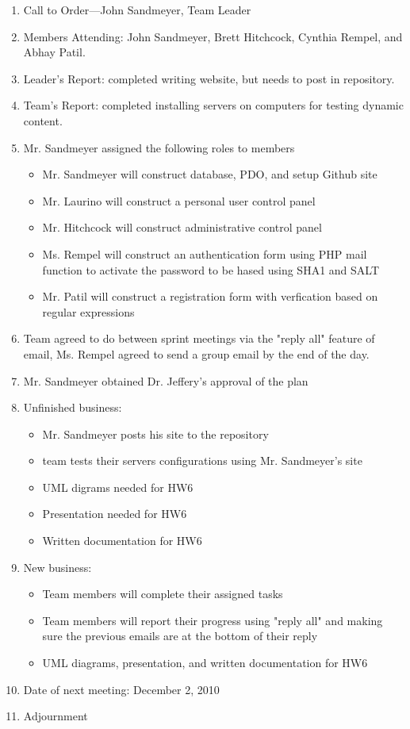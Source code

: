 \documentclass[10pt, oneside, letterpaper]{book}
\begin{document}
\begin{enumerate}
\itemindent=-75pt
\rightmargin=0pt
\item{Call to Order---John Sandmeyer, Team Leader}
\item{Members Attending: John Sandmeyer, Brett Hitchcock, Cynthia Rempel, and Abhay Patil.}
\item{Leader's Report: completed writing website, but needs to post in repository.}
\item{Team's Report: completed installing servers on computers for testing dynamic content.}
\item{Mr. Sandmeyer assigned the following roles to members}
\begin{itemize}
\itemindent=-75pt
\item Mr. Sandmeyer will construct database, PDO, and setup Github site
\item Mr. Laurino will construct a personal user control panel
\item Mr. Hitchcock will construct administrative control panel
\item Ms. Rempel will construct an authentication form using PHP mail function to activate the password to be hased using SHA1 and SALT
\item Mr. Patil will construct a registration form with verfication based on regular expressions
\end{itemize}
\item{Team agreed to do between sprint meetings via the "reply all" feature of email, Ms. Rempel agreed to send a group email by the end of the day.}
\item{Mr. Sandmeyer obtained Dr. Jeffery's approval of the plan}
\item{Unfinished business:}
\begin{itemize}
\itemindent=-75pt
\item Mr. Sandmeyer posts his site to the repository
\item team tests their servers configurations using Mr. Sandmeyer's site
\item UML digrams needed for HW6
\item Presentation needed for HW6
\item Written documentation for HW6
\end{itemize}
\item{New business:}
\begin{itemize}
\itemindent=-75pt
\item Team members will complete their assigned tasks
\item Team members will report their progress using "reply all" and making sure the previous emails are at the bottom of their reply
\item UML diagrams, presentation, and written documentation for HW6
\end{itemize}
\item{Date of next meeting: December 2, 2010}
\item{Adjournment}
\end{enumerate}
\end{document}

